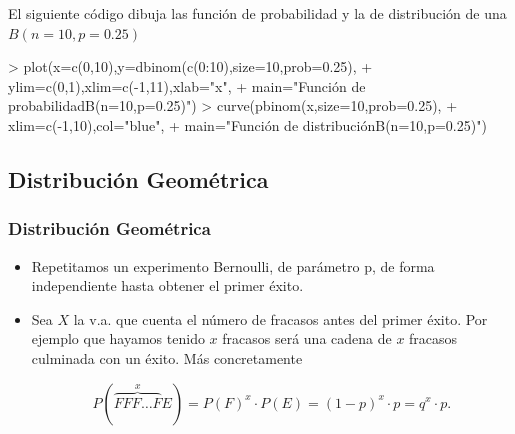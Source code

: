\documentclass[handout]{beamer}
\theoremstyle{plain}
\theoremstyle{definition}
\begin{document}

\begin{frame}[fragile]

El siguiente código dibuja las función de probabilidad y la de distribución de una  $B(n=10,p=0.25)$

\begin{Schunk}
\begin{Sinput}
> plot(x=c(0,10),y=dbinom(c(0:10),size=10,prob=0.25),
+   ylim=c(0,1),xlim=c(-1,11),xlab="x",
+   main="Función de probabilidad\n B(n=10,p=0.25)")
> curve(pbinom(x,size=10,prob=0.25),
+   xlim=c(-1,10),col="blue",
+   main="Función de distribución\n B(n=10,p=0.25)")
\end{Sinput}
\end{Schunk}

\end{frame}


\begin{frame}[fragile]


\end{frame}


\begin{frame}[fragile]


\end{frame}





\subsection{Distribución Geométrica}

\begin{frame}
\frametitle{Distribución Geométrica}

\begin{itemize}
\item Repetitamos un experimento Bernoulli, de parámetro p, de forma independiente hasta obtener el primer éxito.
\item Sea $X$ la v.a. que cuenta el número de fracasos antes del primer éxito. Por ejemplo  que  hayamos tenido  $x$ fracasos  será una cadena de $x$ fracasos culminada con un éxito. Más concretamente 

$$P(\overbrace{FFF\ldots F}^{x}E)=P(F)^{x}\cdot P(E)=(1-p)^{x}\cdot p=q^{x}\cdot p.$$
\end{itemize}
\end{frame}
\end{document}
